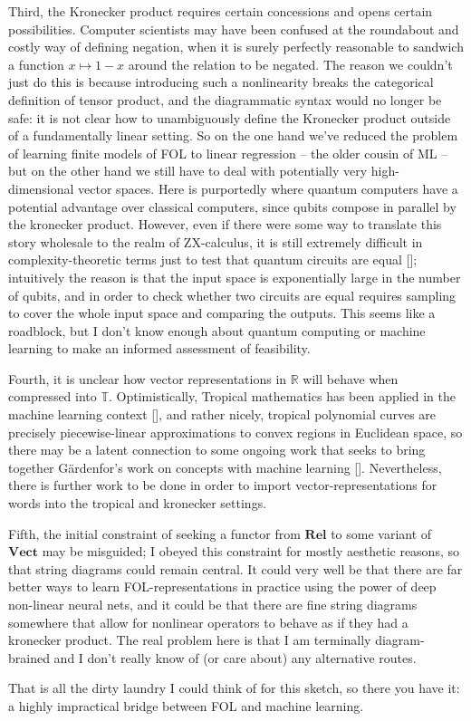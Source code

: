 \begin{fullwidth}
Third, the Kronecker product requires certain concessions and opens certain possibilities. Computer scientists may have been confused at the roundabout and costly way of defining negation, when it is surely perfectly reasonable to sandwich a function $x \mapsto 1-x$ around the relation to be negated. The reason we couldn't just do this is because introducing such a nonlinearity breaks the categorical definition of tensor product, and the diagrammatic syntax would no longer be safe: it is not clear how to unambiguously define the Kronecker product outside of a fundamentally linear setting. So on the one hand we've reduced the problem of learning finite models of FOL to linear regression -- the older cousin of ML -- but on the other hand we still have to deal with potentially very high-dimensional vector spaces. Here is purportedly where quantum computers have a potential advantage over classical computers, since qubits compose in parallel by the kronecker product. However, even if there were some way to translate this story wholesale to the realm of ZX-calculus, it is still extremely difficult in complexity-theoretic terms just to test that quantum circuits are equal []; intuitively the reason is that the input space is exponentially large in the number of qubits, and in order to check whether two circuits are equal requires sampling to cover the whole input space and comparing the outputs. This seems like a roadblock, but I don't know enough about quantum computing or machine learning to make an informed assessment of feasibility.

Fourth, it is unclear how vector representations in $\mathbb{R}$ will behave when compressed into $\mathbb{T}$. Optimistically, Tropical mathematics has been applied in the machine learning context [], and rather nicely, tropical polynomial curves are precisely piecewise-linear approximations to convex regions in Euclidean space, so there may be a latent connection to some ongoing work that seeks to bring together G\"{a}rdenfor's work on concepts with machine learning []. Nevertheless, there is further work to be done in order to import vector-representations for words into the tropical and kronecker settings.

Fifth, the initial constraint of seeking a functor from $\textbf{Rel}$ to some variant of $\textbf{Vect}$ may be misguided; I obeyed this constraint for mostly aesthetic reasons, so that string diagrams could remain central. It could very well be that there are far better ways to learn FOL-representations in practice using the power of deep non-linear neural nets, and it could be that there are fine string diagrams somewhere that allow for nonlinear operators to behave as if they had a kronecker product. The real problem here is that I am terminally diagram-brained and I don't really know of (or care about) any alternative routes.

That is all the dirty laundry I could think of for this sketch, so there you have it: a highly impractical bridge between FOL and machine learning. 

\end{fullwidth}